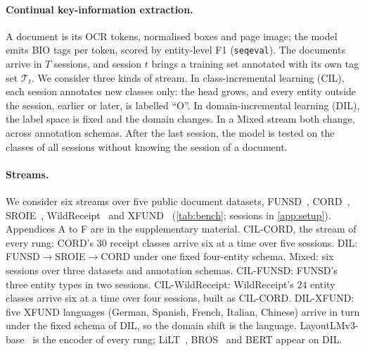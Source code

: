 \documentclass[10pt,twocolumn,letterpaper]{article}
\begin{document}
\paragraph{Continual key-information extraction.} A document is its OCR tokens, normalised boxes and page image; the model emits BIO tags per token, scored by entity-level F1 (\texttt{seqeval}). The documents arrive in $T$ sessions, and session $t$ brings a training set annotated with its own tag set $\mathcal{T}_t$. We consider three kinds of stream. In class-incremental learning (CIL), each session annotates new classes only: the head grows, and every entity outside the session, earlier or later, is labelled ``O''. In domain-incremental learning (DIL), the label space is fixed and the domain changes. In a Mixed stream both change, across annotation schemas. After the last session, the model is tested on the classes of all sessions without knowing the session of a document.

\paragraph{Streams.} We consider six streams over five public document datasets, FUNSD~\citep{jaume2019funsd}, CORD~\citep{park2019cord}, SROIE~\citep{huang2019sroie}, WildReceipt~\citep{sun2021sdmgr} and XFUND~\citep{xu2022xfund} (\cref{tab:bench}; sessions in \cref{app:setup}). Appendices A to F are in the supplementary material. CIL-CORD, the stream of every rung: CORD's $30$ receipt classes arrive six at a time over five sessions. DIL: FUNSD$\rightarrow$SROIE$\rightarrow$CORD under one fixed four-entity schema. Mixed: six sessions over three datasets and annotation schemas. CIL-FUNSD: FUNSD's three entity types in two sessions. CIL-WildReceipt: WildReceipt's $24$ entity classes arrive six at a time over four sessions, built as CIL-CORD. DIL-XFUND: five XFUND languages (German, Spanish, French, Italian, Chinese) arrive in turn under the fixed schema of DIL, so the domain shift is the language. LayoutLMv3-base~\citep{huang2022layoutlmv3} is the encoder of every rung; LiLT~\citep{wang2022lilt}, BROS~\citep{hong2022bros} and BERT appear on DIL.

\begin{table}[t]
\centering\scriptsize
\setlength{\tabcolsep}{2.5pt}
\caption{\textbf{Benchmark settings}: six streams over five document datasets (sessions: \cref{app:setup}). Train/test documents: FUNSD 149/50, SROIE 626/347, CORD 800/100. AA: mean F1 of the final model over the sessions; full-label F1: on the unmasked test set of the stream's dataset (\cref{sec:setup}).}
\label{tab:bench}

\end{table}
\end{document}
